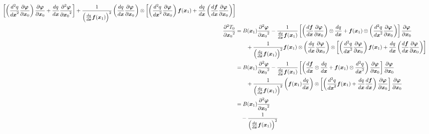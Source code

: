 \documentclass[a4paper]{article}
\newcommand{\deriv}[3][1]{%
    \ifthenelse{\equal{#1}{1}}{\frac{d #2}{d #3}}{\frac{d^#1 #2}{{d #3}^#1}}
}
\newcommand{\pderiv}[3][1]{%
    \ifthenelse{\equal{#1}{1}}{\frac{\partial #2}{\partial #3}}{\frac{\partial^#1 #2}{{\partial #3}^#1}}
}
\newcommand{\parens}[1]{\left(#1\right)}
\newcommand{\brackets}[1]{\left[#1\right]}
\newcommand{\traj}{\bm \varphi}
\begin{document}
\begin{align}
\begin{aligned}
{        }
        \brackets{
            \parens{\deriv[2]{q}{\bm x}\pderiv{\traj}{\bm x_0}}
            \pderiv{\traj}{\bm x_0}
            +
            \deriv{q}{\bm x}\pderiv[2]{\traj}{\bm x_0}
            }
        + \frac{1}{
            \parens{\deriv{q}{\bm x}\bm f(\bm x_1)}^2
        }
        \parens{\deriv{q}{\bm x}\pderiv{\traj}{\bm x_0}}\otimes
        \brackets{
            \parens{
                \deriv[2]{q}{\bm x}\pderiv{\traj}{\bm x_0}
            }
            \bm f(\bm x_1)
            +
            \deriv{q}{\bm x}
            \parens{\deriv{\bm f}{\bm x} \pderiv{\traj}{\bm x_0}}
        }
        \\
        \pderiv[2]{T_0}{\bm x_0}
        &= B(\bm x_1) \pderiv[2]{\traj}{\bm x_0}
        - \frac{1}{\deriv{q}{\bm x} \bm f(\bm x_1)}
        \brackets{
            \parens{
                \deriv{\bm f}{\bm x}
                \pderiv{\traj}{\bm x_0}
            }
            \otimes \deriv{q}{\bm x}
            +
            \bm f(\bm x_1) \otimes \parens{\deriv[2]{q}{\bm x}\pderiv{\traj}{\bm x_0}}
        } \pderiv{\traj}{\bm x_0}
        \\
        &\qquad
        + \frac{1}{
            \parens{\deriv{q}{\bm x}\bm f(\bm x_1)}^2
        } \bm f(\bm x_1) \otimes
        \parens{\deriv{q}{\bm x}\pderiv{\traj}{\bm x_0}}\otimes
        \brackets{
            \parens{
                \deriv[2]{q}{\bm x}\pderiv{\traj}{\bm x_0}
            }
            \bm f(\bm x_1)
            +
            \deriv{q}{\bm x}
            \parens{\deriv{\bm f}{\bm x} \pderiv{\traj}{\bm x_0}}
        }
        \\
        &= B(\bm x_1) \pderiv[2]{\traj}{\bm x_0}
        - \frac{1}{\deriv{q}{\bm x} \bm f(\bm x_1)}
        \brackets{\parens{
            \deriv{\bm f}{\bm x}
            \otimes \deriv{q}{\bm x}
            +
            \bm f(\bm x_1) \otimes \deriv[2]{q}{\bm x}
        }\pderiv{\traj}{\bm x_0}}  \pderiv{\traj}{\bm x_0}
        \\
        &\qquad
        + \frac{1}{
            \parens{\deriv{q}{\bm x}\bm f(\bm x_1)}^2
        }
        \parens{\bm f(\bm x_1) \deriv{q}{\bm x}}\otimes
        \brackets{\parens{
            \deriv[2]{q}{\bm x} \bm f(\bm x_1)
            +
            \deriv{q}{\bm x} \deriv{\bm f}{\bm x}
        }\pderiv{\traj}{\bm x_0}} \pderiv{\traj}{\bm x_0}
        \\
        &= B(\bm x_1) \pderiv[2]{\traj}{\bm x_0}
        \\
        &\quad
        - \frac{1}{\parens{\deriv{q}{\bm x} \bm f(\bm x_1)}^2}

\end{aligned}
\end{align}
\end{document}
